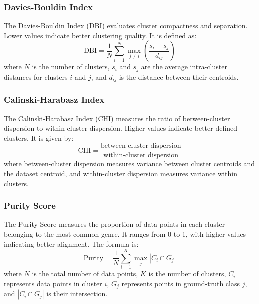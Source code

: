 \documentclass[conference]{IEEEtran}
\begin{document}
\subsubsection{Davies-Bouldin Index}
The Davies-Bouldin Index (DBI) evaluates cluster compactness and separation. Lower values indicate better clustering quality. It is defined as:
\begin{equation}
    \mathrm{DBI} = \frac{1}{N} \sum_{i=1}^{N} \max_{j \neq i} \left( \frac{s_i + s_j}{d_{ij}} \right)
    \label{eq:davies_bouldin_index}
\end{equation}
where \( N \) is the number of clusters, \( s_i \) and \( s_j \) are the average intra-cluster distances for clusters \( i \) and \( j \), and \( d_{ij} \) is the distance between their centroids.

\subsubsection{Calinski-Harabasz Index}
The Calinski-Harabasz Index (CHI) measures the ratio of between-cluster dispersion to within-cluster dispersion. Higher values indicate better-defined clusters. It is given by:
\begin{equation}
    \mathrm{CHI} = \frac{\text{between-cluster dispersion}}{\text{within-cluster dispersion}}
    \label{eq:calinski-harabasz_index}
\end{equation}
where between-cluster dispersion measures variance between cluster centroids and the dataset centroid, and within-cluster dispersion measures variance within clusters.

\subsubsection{Purity Score}
The Purity Score measures the proportion of data points in each cluster belonging to the most common genre. It ranges from 0 to 1, with higher values indicating better alignment. The formula is:
\begin{equation}
    \text{Purity} = \frac{1}{N} \sum_{i=1}^{K} \max_j \left| C_i \cap G_j \right|
    \label{eq:purity_score}
\end{equation}
where \( N \) is the total number of data points, \( K \) is the number of clusters, \( C_i \) represents data points in cluster \( i \), \( G_j \) represents points in ground-truth class \( j \), and \( \left| C_i \cap G_j \right| \) is their intersection.
\end{document}
